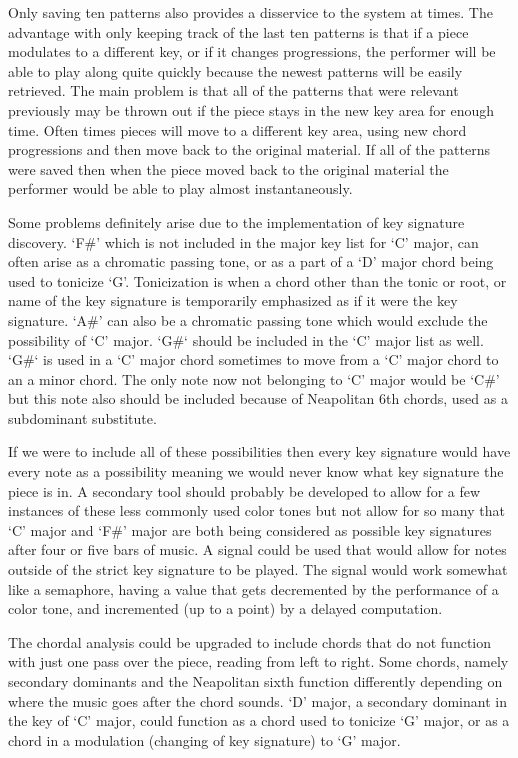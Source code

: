 \documentclass[12pt]{ucthesis}
\begin{document}
Only saving ten patterns also provides a disservice to the system at times. The advantage with only keeping track of the last ten patterns is that if a piece modulates to a different key, or if it changes progressions, the performer will be able to play along quite quickly because the newest patterns will be easily retrieved. The main problem is that all of the patterns that were relevant previously may be thrown out if the piece stays in the new key area for enough time. Often times pieces will move to a different key area, using new chord progressions and then move back to the original material. If all of the patterns were saved then when the piece moved back to the original material the performer would be able to play almost instantaneously. 

Some problems definitely arise due to the implementation of key signature discovery. `F\#' which is not included in the major key list for `C' major, can often arise as a chromatic passing tone, or as a part of a `D' major chord being used to tonicize `G'. Tonicization is when a chord other than the tonic or root, or name of the key signature is temporarily emphasized as if it were the key signature. `A\#' can also be a chromatic passing tone which would exclude the possibility of `C' major. `G\#` should be included in the `C' major list as well. `G\#` is used in a `C' major chord sometimes to move from a `C' major chord to an a minor chord. The only note now not belonging to `C' major would be `C\#' but this note also should be included because of Neapolitan 6th chords, used as a subdominant substitute.

If we were to include all of these possibilities then every key signature would have every note as a possibility meaning we would never know what key signature the piece is in. A secondary tool should probably be developed to allow for a few instances of these less commonly used color tones but not allow for so many that `C' major and `F\#' major are both being considered as possible key signatures after four or five bars of music. A signal could be used that would allow for notes outside of the strict key signature to be played. The signal would work somewhat like a semaphore, having a value that gets decremented by the performance of a color tone, and incremented (up to a point) by a delayed computation. 

The chordal analysis could be upgraded to include chords that do not function with just one pass over the piece, reading from left to right. Some chords, namely secondary dominants and the Neapolitan sixth function differently depending on where the music goes after the chord sounds. `D' major, a secondary dominant in the key of `C' major, could function as a chord used to tonicize `G' major, or as a chord in a modulation (changing of key signature) to `G' major. 
\end{document}
